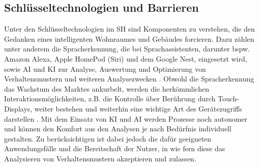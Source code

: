         \subsection*{Schlüsseltechnologien und Barrieren}
            Unter den Schlüsseltechnologien im \acl{SH} sind Komponenten zu verstehen, die den Gedanken eines intelligenten 
            Wohnraumes und Gebäudes forcieren. Dazu zählen unter anderem die Spracherkennung, die bei Sprachassistenten, 
            darunter bspw. Amazon Alexa, Apple HomePod (Siri) und dem Google Nest, eingesetzt wird, sowie \ac{AI} und \ac{KI} 
            zur Analyse, Auswertung und Optimierung von Verhaltensmustern und weiteren Analysezwecken \cite{statista2021}. 
            Obwohl die Spracherkennung das Wachstum des Marktes ankurbelt, werden die herkömmlichen Interaktionsmöglichkeiten, 
            z.B. die Kontrolle über Berührung durch Touch-Displays,
            weiter bestehen und weiterhin eine wichtige Art des Gerätezugriffs darstellen \cite{all-electronics2022}. 
            Mit dem Einsatz von \acs{KI} und \acs{AI} werden Prozesse noch autonomer und können den Komfort aus den Analysen je 
            nach Bedürfnis individuell gestalten. Zu berücksichtigen ist dabei jedoch die dafür geeigneten Anwendungsfälle und 
            die Bereitschaft der Nutzer, in wie fern diese das Analysieren von Verhaltensmustern akzeptieren und zulassen. 
            
